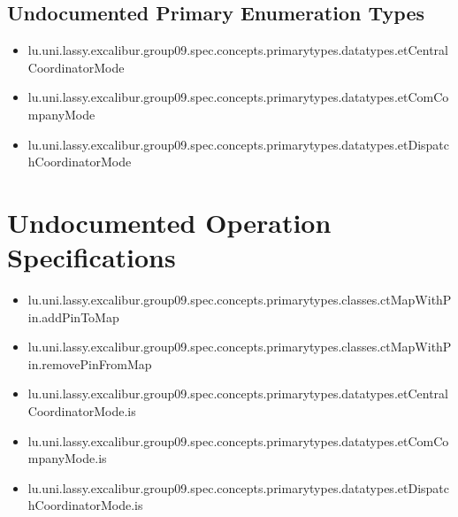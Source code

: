 \subsection[Undocumented Primary Enumeration Types]{Undocumented Primary Enumeration Types}
\begin{itemize}
\item lu.uni.lassy.excalibur.group09.spec.concepts.primarytypes.datatypes.etCentralCoordinatorMode 
\item lu.uni.lassy.excalibur.group09.spec.concepts.primarytypes.datatypes.etComCompanyMode 
\item lu.uni.lassy.excalibur.group09.spec.concepts.primarytypes.datatypes.etDispatchCoordinatorMode 
\end{itemize}















\section[Undocumented Operation Specifications]{Undocumented Operation Specifications}
\begin{itemize}
\item lu.uni.lassy.excalibur.group09.spec.concepts.primarytypes.classes.ctMapWithPin.addPinToMap 
\item lu.uni.lassy.excalibur.group09.spec.concepts.primarytypes.classes.ctMapWithPin.removePinFromMap 
\item lu.uni.lassy.excalibur.group09.spec.concepts.primarytypes.datatypes.etCentralCoordinatorMode.is 
\item lu.uni.lassy.excalibur.group09.spec.concepts.primarytypes.datatypes.etComCompanyMode.is 
\item lu.uni.lassy.excalibur.group09.spec.concepts.primarytypes.datatypes.etDispatchCoordinatorMode.is 
\end{itemize}








